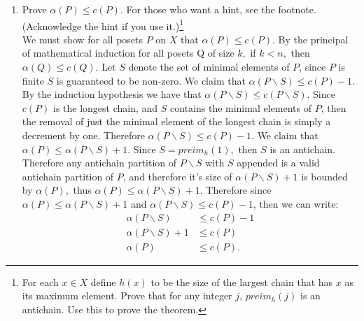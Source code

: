 \documentclass[12pt, letterpaper]{article}
\begin{document}
\begin{enumerate}
\begin{itemize}
			
	 
\end{itemize}  
\fi

\item Prove $\alpha(P) \leq c(P)$. For those who want a hint, see the footnote. (Acknowledge the hint if you use it.)\footnote{For each $x \in X$ define $h(x)$ to be the size of the largest chain that has $x$ as its maximum element.  Prove that for any integer $j$, $preim_h(j)$ is an antichain.  Use this to prove the theorem.}\\
	We must show for all posets $P$ on $X$ that $\alpha(P) \leq c(P).$  By the principal of mathematical induction for all posets Q of size $k,$ if $k < n,$ then $\alpha(Q) \leq c(Q).$  
	Let $S$ denote the set of minimal elements of $P$, since $P$ is finite $S$ is guaranteed to be non-zero.  We claim that $\alpha(P \backslash S) \leq c(P) - 1$.  
	By the induction hypothesis we have that $\alpha(P\backslash S) \leq c(P \backslash S)$.  
	Since $c(P)$ is the longest chain, and $S$ contains the minimal elements of $P$, then the removal of just the minimal element of the longest chain is simply a decrement by one.  
	Therefore $\alpha(P \backslash S) \leq c(P) - 1$.  We claim that $\alpha(P) \leq \alpha(P\backslash S) + 1$.  Since $S = preim_h(1),$ then $S$ is an antichain.  Therefore any antichain partition of $P \backslash S$ with $S$ appended is a valid antichain partition of $P$, and therefore it's size of $\alpha(P \backslash S) +1$ is bounded by $\alpha(P),$ thus $\alpha(P) \leq \alpha(P \backslash S) +1$.  Therefore since $\alpha(P) \leq \alpha(P \backslash S) +1$ and $\alpha(P \backslash S) \leq c(P) - 1$, then we can write:
	\begin{align*}
	\alpha(P \backslash S) &\leq c(P) - 1\\
	\alpha(P \backslash S) + 1 &\leq c(P)\\
	\alpha(P) &\leq c(P).
\end{align*}	 
\end{enumerate}
\end{document}
